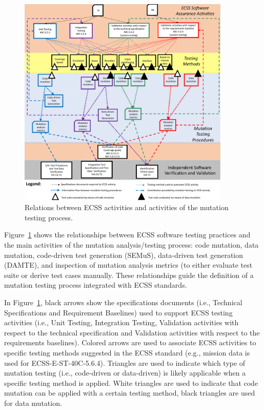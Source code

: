 \begin{figure}[h]
  \centering
    \includegraphics[width=0.9\textwidth]{images/ECSSTesting}
      \caption{Relations between ECSS activities and activities of the mutation testing process.}
      \label{fig:ECSSTesting}
\end{figure} 

Figure~\ref{fig:ECSSTesting} shows the relationships between ECSS software testing practices and the main activities of the mutation analysis/testing process: code mutation, data mutation, code-driven test generation (SEMuS), data-driven test generation (DAMTE), and inspection of mutation analysis metrics (to either evaluate test suite or derive test cases manually. These relationships guide the definition of a mutation testing process integrated with ECSS standards.
 
In Figure~\ref{fig:ECSSTesting}, black arrows show the specifications documents (i.e., Technical Specifications and Requirement Baselines) used to support ECSS testing activities (i.e., Unit Testing, Integration Testing, Validation activities with respect to the technical specification and Validation activities with respect to the requirements baselines). Colored arrows are used to associate ECSS activities to specific testing methods suggested in the ECSS standard (e.g., mission data is used for ECSS-E-ST-40C-5.6.4). Triangles are used to indicate which type of mutation testing (i.e., code-driven or data-driven) is likely applicable when a specific testing method is applied. White triangles are used to indicate that code mutation can be applied with a certain testing method, black triangles are used for data mutation. 

